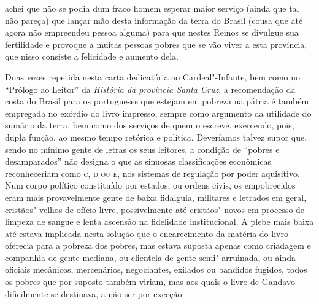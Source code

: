 \begin{hedraquote}
achei que não se podia dum fraco homem esperar maior serviço (ainda que
tal não pareça) que lançar mão desta informação da terra do Brasil
(cousa que até agora não empreendeu pessoa alguma) para que nestes Reinos
se divulgue sua fertilidade e provoque a muitas pessoas pobres que se
vão viver a esta província, que nisso consiste a felicidade e aumento dela.
\end{hedraquote}

Duas vezes repetida nesta carta dedicatória ao Cardeal"-Infante, bem como
no ``Prólogo ao Leitor'' da \textit{História da província Santa Cruz}, 
a recomendação da costa do Brasil para os
portugueses que estejam em pobreza na pátria é também empregada no
exórdio do livro impresso, sempre como argumento da utilidade do
sumário da terra, bem como dos serviços de quem o escreve, exercendo,
pois, dupla função, ao mesmo tempo retórica e política. Deveríamos
talvez supor que, sendo no mínimo gente de letras os seus leitores, a
condição de ``pobres e desamparados'' não designa o que as sinuosas 
classificações econômicas reconheceriam como
\textsc{c, d ou e}, nos sistemas de regulação por poder aquisitivo. Num corpo
político constituído por estados, ou ordens civis, os empobrecidos eram
mais provavelmente gente de baixa fidalguia, militares e letrados em
geral, cristãos"-velhos de ofício livre, possivelmente até
cristãos"-novos em processo de limpeza de sangue e lenta ascensão na
fidelidade institucional. A plebe mais baixa até estava implicada nesta
solução que o encarecimento da matéria do livro oferecia para a pobreza
dos pobres, mas estava suposta apenas como criadagem e companhia de
gente mediana, ou clientela de gente semi"-arruinada, ou ainda oficiais
mecânicos, mercenários, negociantes, exilados ou bandidos fugidos,
todos os pobres que por suposto também viriam, mas aos quais o livro de
Gandavo dificilmente se destinava, a não ser por exceção.

